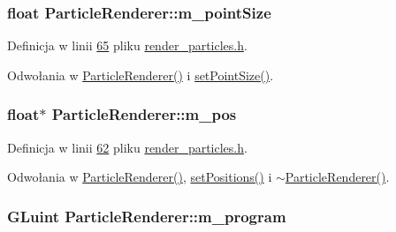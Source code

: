 \hypertarget{class_particle_renderer_a1ca13e546c937cb546c0da19fa853b34}{
\subsubsection[{m\-\_\-point\-Size}]{\setlength{\rightskip}{0pt plus 5cm}float Particle\-Renderer\-::m\-\_\-point\-Size\hspace{0.3cm}{\ttfamily [protected]}}}\label{class_particle_renderer_a1ca13e546c937cb546c0da19fa853b34}


Definicja w linii \hyperlink{render__particles_8h_source_l00065}{65} pliku \hyperlink{render__particles_8h_source}{render\-\_\-particles.\-h}.



Odwołania w \hyperlink{render__particles_8cpp_source_l00025}{Particle\-Renderer()} i \hyperlink{render__particles_8h_source_l00038}{set\-Point\-Size()}.

\hypertarget{class_particle_renderer_a1d74720edb5c3a13edcdd176ac0d84c7}{
\subsubsection[{m\-\_\-pos}]{\setlength{\rightskip}{0pt plus 5cm}float$\ast$ Particle\-Renderer\-::m\-\_\-pos\hspace{0.3cm}{\ttfamily [protected]}}}\label{class_particle_renderer_a1d74720edb5c3a13edcdd176ac0d84c7}


Definicja w linii \hyperlink{render__particles_8h_source_l00062}{62} pliku \hyperlink{render__particles_8h_source}{render\-\_\-particles.\-h}.



Odwołania w \hyperlink{render__particles_8cpp_source_l00025}{Particle\-Renderer()}, \hyperlink{render__particles_8cpp_source_l00042}{set\-Positions()} i \hyperlink{render__particles_8cpp_source_l00037}{$\sim$\-Particle\-Renderer()}.

\hypertarget{class_particle_renderer_ab8f0dd1a6e0f4401012bd46ae8940648}{
\subsubsection[{m\-\_\-program}]{\setlength{\rightskip}{0pt plus 5cm}G\-Luint Particle\-Renderer\-::m\-\_\-program\hspace{0.3cm}{\ttfamily [protected]}}}\label{class_particle_renderer_ab8f0dd1a6e0f4401012bd46ae8940648}


